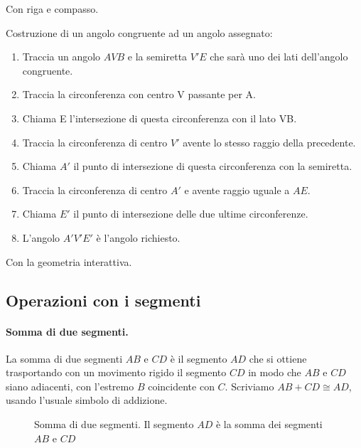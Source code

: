Con riga e compasso.

\begin{procedura}\label{proc:fonda_trasp_ang}
 Costruzione di un angolo congruente ad un angolo assegnato:
\begin{enumerate} [nosep]
\item 
Traccia un angolo \(AVB\) e la semiretta  \(V'E\) che sarà uno dei lati 
dell'angolo congruente.
\item 
Traccia la circonferenza con centro V passante per A.
\item
Chiama E l'intersezione di questa circonferenza con il lato VB.
\item 
Traccia la circonferenza di centro \(V'\)  avente lo stesso raggio della 
precedente.
\item
Chiama \(A'\) il punto di intersezione di questa circonferenza con la 
semiretta. 
\item 
Traccia la circonferenza di centro \(A'\) e  avente raggio uguale a \(AE\).
\item 
Chiama \(E'\) il punto di intersezione delle due ultime circonferenze.
\item 
L'angolo \(A'V'E'\) è l'angolo richiesto.
\end{enumerate}
\end{procedura}

Con la geometria interattiva.




\subsection{Operazioni con i segmenti}

\paragraph{Somma di due segmenti.} La somma di due segmenti $AB$ e 
$CD$ è il segmento $AD$ che si ottiene trasportando con un movimento 
rigido il segmento $CD$ in modo che $AB$ e $CD$ siano adiacenti, con 
l'estremo $B$ coincidente con $C$. Scriviamo $AB + CD \cong AD$, 
usando l'usuale simbolo di addizione.


\begin{inaccessibleblock}
 \begin{figure}[htb]
\centering
\caption{Somma di due segmenti. Il segmento $AD$ è la somma dei 
segmenti $AB$ e $CD$}
\end{figure}
\end{inaccessibleblock}

